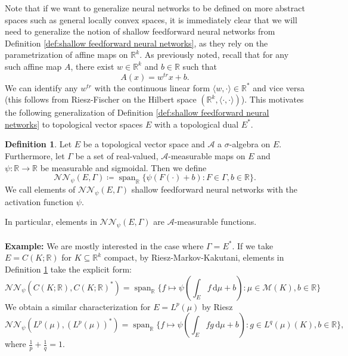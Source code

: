\documentclass[11pt,a4paper,twoside,openany]{report}
\numberwithin{equation}{section}
\newcommand{\diff}{\mathrm{d}}
\theoremstyle{plain} %
\theoremstyle{definition} %
\newtheorem{definition}[theorem]{Definition}
\theoremstyle{remark} %
\let\parencite\authnumparencite
\begin{document}
Note that if we want to generalize neural networks to be defined on more abstract spaces such as general locally convex spaces, it is immediately clear that we will need to generalize the notion of shallow feedforward neural networks from Definition \ref{def:shallow feedforward neural networks}, as they rely on the parametrization of affine maps on \(\mathbb{R}^k\). As previously noted, recall that for any such affine map \(A\), there exist \(w\in\mathbb{R}^k\) and \(b \in \mathbb{R}\) such that 
\begin{equation*}
    A(x)=w^{tr}x+b.
\end{equation*}
We can identify any \(w^{tr}\) with the continuous linear form \(\langle w,\cdot\rangle\in\mathbb{R}^*\) and vice versa (this follows from Riesz-Fischer \parencite[Cor.~4.3.2.]{Bogachev2007MeasureTheory} on the Hilbert space \((\mathbb{R}^k,\langle\cdot,\cdot\rangle)\)). This motivates the following generalization of Definition \ref{def:shallow feedforward neural networks} to topological vector spaces \(E\) with a topological dual \(E^*\).
\begin{definition}\label{def:NN on locally convex X}
    Let \(E\) be a topological vector space and \(\mathcal{A}\) a \(\sigma\)-algebra on \(E\). Furthermore, let \(\Gamma\) be a set of real-valued, \(\mathcal{A}\)-measurable maps on \(E\) and \(\psi:\mathbb{R}\to\mathbb{R}\) be measurable and sigmoidal. Then we define 
    \begin{equation*}
        \mathcal{NN}_{\psi}(E,\Gamma)\coloneqq\operatorname{span}_{\mathbb{R}}\{\psi(F(\cdot)+b):F\in \Gamma,b\in\mathbb{R}\}.
    \end{equation*}
    We call elements of \(\mathcal{NN}_{\psi}(E,\Gamma)\) shallow feedforward neural networks with the activation function \(\psi\).
\end{definition}
In particular, elements in \(\mathcal{NN}_{\psi}(E,\Gamma)\) are \(\mathcal{A}\)-measurable functions.
\\\\
\textbf{Example:} We are mostly interested in the case where \(\Gamma=E^*\). If we take \(E=C(K;\mathbb{R})\) for \(K\subseteq\mathbb{R}^k\) compact, by Riesz-Markov-Kakutani, elements in Definition \ref{def:NN on locally convex X} take the explicit form:
\begin{equation*}
     \mathcal{NN}_{\psi}(C(K;\mathbb{R}),C(K;\mathbb{R})^*)=\operatorname{span}_{\mathbb{R}}\{f\mapsto\psi(\int_E f\,\diff \mu+b):\mu\in\mathcal{M}(K),b\in\mathbb{R}\}
\end{equation*}
We obtain a similar characterization for \(E=L^p(\mu)\) by Riesz
\begin{equation*}
     \mathcal{NN}_{\psi}(L^p(\mu),(L^p(\mu))^*)=\operatorname{span}_{\mathbb{R}}\{f\mapsto\psi(\int_E fg\,\diff \mu+b):g\in L^q(\mu)(K),b\in\mathbb{R}\},
\end{equation*}
where \(\frac{1}{p}+\frac{1}{q}=1\).
\end{document}
